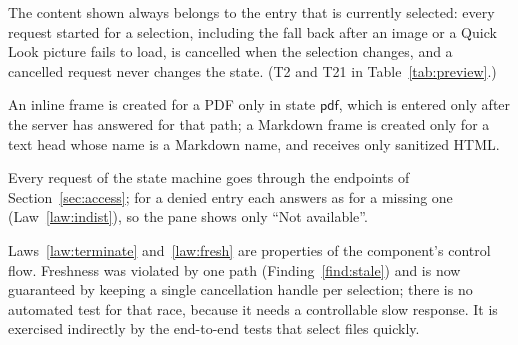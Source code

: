 \begin{law}[Freshness]
\label{law:fresh}
The content shown always belongs to the entry that is currently selected: every
request started for a selection, including the fall back after an image or a Quick
Look picture fails to load, is cancelled when the selection changes, and a cancelled request never
changes the state.  (T2 and T21 in Table~\ref{tab:preview}.)
\end{law}

\begin{law}
\label{law:frame-confirmed}
An inline frame is created for a PDF only in state $\mathsf{pdf}$, which is
entered only after the server has answered  for that
path; a Markdown frame is created only for a text head whose name is a Markdown
name, and receives only sanitized HTML.
\end{law}

\begin{law}
\label{law:preview-denied}
Every request of the state machine goes through the endpoints of
Section~\ref{sec:access}; for a denied entry each answers as for a missing one
(Law~\ref{law:indist}), so the pane shows only ``Not available''.
\end{law}

\begin{boundary}
Laws~\ref{law:terminate} and~\ref{law:fresh} are properties of the component's
control flow.  Freshness was violated by one path (Finding~\ref{find:stale}) and
is now guaranteed by keeping a single cancellation handle per selection; there
is no automated test for that race, because it needs a controllable slow
response.  It is exercised indirectly by the end-to-end tests that select files
quickly.
\end{boundary}
